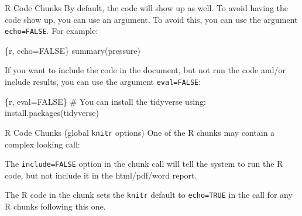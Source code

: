 \documentclass[
  ignorenonframetext,
  aspectratio=169]{beamer}
\newenvironment{Shaded}{\begin{snugshade}}{\end{snugshade}}
\newcommand{\NormalTok}[1]{#1}
\begin{document}
\begin{frame}[fragile]{R Code Chunks}
\label{r-code-chunks-3}
By default, the code will show up as well. To avoid having the code show
up, you can use an argument. To avoid this, you can use the argument
\texttt{echo=FALSE}. For example:

\begin{Shaded}
\begin{Highlighting}[]
\NormalTok{\textasciigrave{}\textasciigrave{}\textasciigrave{}\{r, echo=FALSE\}}
\NormalTok{summary(pressure)}
\NormalTok{\textasciigrave{}\textasciigrave{}\textasciigrave{}}
\end{Highlighting}
\end{Shaded}

If you want to include the code in the document, but not run the code
and/or include results, you can use the argument \texttt{eval=FALSE}:

\begin{Shaded}
\begin{Highlighting}[]
\NormalTok{\textasciigrave{}\textasciigrave{}\textasciigrave{}\{r, eval=FALSE\}}
\NormalTok{\# You can install the tidyverse using:}
\NormalTok{install.packages(tidyverse)}
\NormalTok{\textasciigrave{}\textasciigrave{}\textasciigrave{}}
\end{Highlighting}
\end{Shaded}
\end{frame}

\begin{frame}[fragile]{R Code Chunks (global \texttt{knitr} options)}
\label{r-code-chunks-global-knitr-options}
One of the R chunks may contain a complex looking call:

\begin{Shaded}
\end{Shaded}

The \texttt{include=FALSE} option in the chunk call will tell the system
to run the R code, but not include it in the html/pdf/word report.

The R code in the chunk sets the \texttt{knitr} default to
\texttt{echo=TRUE} in the call for any R chunks following this one.
\end{frame}
\end{document}
